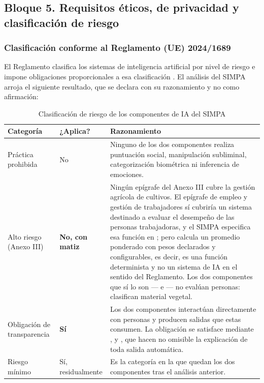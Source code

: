 \subsection{Bloque 5. Requisitos éticos, de privacidad y clasificación de riesgo}

\subsubsection*{Clasificación conforme al Reglamento (UE) 2024/1689}

El Reglamento clasifica los sistemas de inteligencia artificial por nivel de riesgo e impone
obligaciones proporcionales a esa clasificación \cite{aiact2024}. El análisis del SIMPA arroja el
siguiente resultado, que se declara con su razonamiento y no como afirmación:

\begin{table}[H]
\centering\footnotesize
\caption{Clasificación de riesgo de los componentes de IA del SIMPA}
\label{tab:riesgo-ia-inf}
\begin{tabular}{|L{3.4cm}|C{2.6cm}|L{9.2cm}|}
\hline
{}\textbf{Categoría} & \textbf{¿Aplica?} & \textbf{Razonamiento}\\ \hline
Práctica prohibida & No & Ninguno de los dos componentes realiza puntuación social, manipulación subliminal, categorización biométrica ni inferencia de emociones.\\ \hline
Alto riesgo (Anexo III) & \textbf{No, con matiz} & Ningún epígrafe del Anexo III cubre la gestión agrícola de cultivos. El epígrafe de empleo y gestión de trabajadores sí cubriría un sistema destinado a evaluar el desempeño de las personas trabajadoras, y el SIMPA especifica esa función en ; pero  calcula un promedio ponderado con pesos declarados y configurables, es decir, es una función determinista y no un sistema de IA en el sentido del Reglamento. Los dos componentes que sí lo son --- e --- no evalúan personas: clasifican material vegetal.\\ \hline
Obligación de transparencia & \textbf{Sí} & Los dos componentes interactúan directamente con personas y producen salidas que estas consumen. La obligación se satisface mediante ,  y , que hacen no omisible la explicación de toda salida automática.\\ \hline
Riesgo mínimo & Sí, residualmente & Es la categoría en la que quedan los dos componentes tras el análisis anterior.\\ \hline
\end{tabular}
\end{table}


